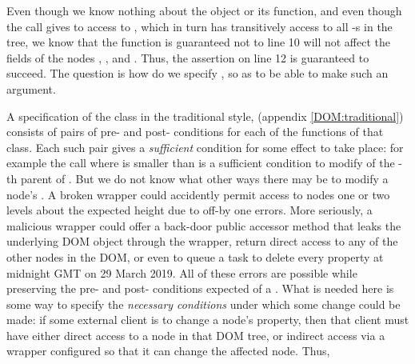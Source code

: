 Even though we know nothing about the  object or
its  function, and even though the call gives
to  access to , which in turn has transitively
access to all -s in the tree, we know that %
the  function is guaranteed not to line 10 will not
affect the  fields of the nodes , ,
and .  Thus, the assertion on line 12 is guaranteed to
succeed.  The question is how do we specify , so as to be
able to make such an argument. %

A specification of the class  in the traditional
style, \eg \cite{Leavens-etal07} (\cf appendix \ref{DOM:traditional})
consists of pairs of pre- and post- conditions for each of the
functions of that class. Each such pair gives a {\em sufficient}
condition for some effect to take place: for example the
call  where  is smaller
than  is a sufficient condition to modify 
of the -th parent of . But we do not know what
other ways there may be to modify a node's .  A broken
wrapper could accidently permit access to nodes one or two levels
about the expected height due to off-by one errors. More seriously,
a malicious wrapper could offer a
back-door public accessor method that leaks the underlying DOM
object through the wrapper, return direct access to any of the
other nodes in the DOM, or even to queue a task to
delete every property at midnight GMT on 29 March 2019. All of these errors are possible while
preserving the pre- and post- conditions expected of a . 
What is needed here is some way to specify the \emph{necessary
conditions}
under which some change could be made: if some external client is to
change a node's property, then  that client must have either direct
access to a node in that DOM tree, or indirect access via a wrapper
configured so that it can change the affected node.
Thus,


